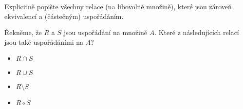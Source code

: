 \begin{exercise}
 Explicitně popište všechny relace (na libovolné množině), které jsou zároveň
 ekvivalencí a (částečným) uspořádáním.
\end{exercise}

\begin{exercise}
 Řekněme, že $R$ a $S$ jsou uspořádání na množině $A$. Které z následujících
 relací jsou také uspořádáními na $A$?
  \begin{itemize}[itemsep=0pt]
  \item $R \cap S$ 
  \item $R \cup S$ 
  \item $R \setminus S$
  \item $R \circ S$
 \end{itemize}
\end{exercise}

